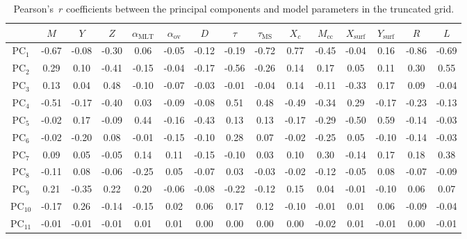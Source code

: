{\begin{landscape}
\begin{table} %
\centering
\caption{Pearson's~$r$ coefficients between the principal components and model parameters in the truncated grid.}
\label{tab:mcoefs}
\hspace*{-0.5cm}
\begin{tabular}{c|cccccccccccccc}
    &$M$   & $Y$         & $Z$         & $\alpha_{\text{MLT}}$     & $\alpha_{\text{ov}}$ & $D$ & $\tau$      & $\tau_{\text{MS}}$     & $X_c$      & $M_{\text{cc}}$  & $X_{\text{surf}}$   & $Y_{\text{surf}}$   & $R$    & $L$                  \\ \hline \hline
PC$_1$  & -0.67 & -0.08 & -0.30 & 0.06      & -0.05     & -0.12 & -0.19 & -0.72 & 0.77     & -0.45   & -0.04   & 0.16   & -0.86 & -0.69 \\
PC$_2$  & 0.29  & 0.10  & -0.41 & -0.15     & -0.04     & -0.17 & -0.56 & -0.26 & 0.14     & 0.17    & 0.05    & 0.11   & 0.30  & 0.55  \\
PC$_3$  & 0.13  & 0.04  & 0.48  & -0.10     & -0.07     & -0.03 & -0.01 & -0.04 & 0.14     & -0.11   & -0.33   & 0.17   & 0.09  & -0.04 \\
PC$_4$  & -0.51 & -0.17 & -0.40 & 0.03      & -0.09     & -0.08 & 0.51  & 0.48  & -0.49    & -0.34   & 0.29    & -0.17  & -0.23 & -0.13 \\
PC$_5$  & -0.02 & 0.17  & -0.09 & 0.44      & -0.16     & -0.43 & 0.13  & 0.13  & -0.17    & -0.29   & -0.50   & 0.59   & -0.14 & -0.03 \\
PC$_6$  & -0.02 & -0.20 & 0.08  & -0.01     & -0.15     & -0.10 & 0.28  & 0.07  & -0.02    & -0.25   & 0.05    & -0.10  & -0.14 & -0.03 \\
PC$_7$  & 0.09  & 0.05  & -0.05 & 0.14      & 0.11      & -0.15 & -0.10 & 0.03  & 0.10     & 0.30    & -0.14   & 0.17   & 0.18  & 0.38  \\
PC$_8$  & -0.11 & 0.08  & -0.06 & -0.25     & 0.05      & -0.07 & 0.03  & -0.03 & -0.02    & -0.12   & -0.05   & 0.08   & -0.07 & -0.09 \\
PC$_9$  & 0.21  & -0.35 & 0.22  & 0.20      & -0.06     & -0.08 & -0.22 & -0.12 & 0.15     & 0.04    & -0.01   & -0.10  & 0.06  & 0.07  \\
PC$_{10}$ & -0.17 & 0.26  & -0.14 & -0.15     & 0.02      & 0.06  & 0.17  & 0.12  & -0.10    & -0.01   & 0.01    & 0.06   & -0.09 & -0.04 \\
PC$_{11}$ & -0.01 & -0.01 & -0.01 & 0.01      & 0.01      & 0.00  & 0.00  & 0.00  & 0.00     & -0.02   & 0.01    & -0.01  & 0.00  & -0.01 \\ \hline
\end{tabular} 
\end{table}
\end{landscape}
}


